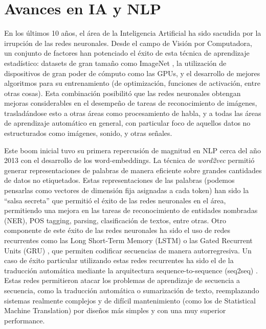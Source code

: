 \section{Avances en IA y NLP}

En los últimos 10 años, el área de la Inteligencia Artificial ha sido sacudida por la irrupción de las redes neuronales. Desde el campo de Visión por Computadora, un conjunto de factores han potenciado el éxito de esta técnica de aprendizaje estadístico: datasets de gran tamaño como ImageNet \cite{imagenet2009deng}, la utilización de dispositivos de gran poder de cómputo como las GPUs, y el desarrollo de mejores algoritmos para su entrenamiento (de optimización, funciones de activación, entre otras cosas). Esta combinación posibilitó que las redes neuronales obtengan mejoras considerables en el desempeño de tareas de reconocimiento de imágenes, trasladándose esto a otras áreas como procesamiento de habla, y a todas las áreas de aprendizaje automático en general, con particular foco de aquellos datos no estructurados como imágenes, sonido, y otras señales.

Este boom inicial tuvo su primera repercusión de magnitud en NLP cerca del año 2013 con el desarrollo de los word-embeddings. La técnica de \emph{word2vec} \cite{mikolov2013distributed} permitió generar representaciones de palabras de manera eficiente sobre grandes cantidades de datos no etiquetados. Estas representaciones de las palabras (podemos pensarlas como vectores de dimensión fija asignadas a cada token) han sido la ``salsa secreta'' que permitió el éxito de las redes neuronales en el área, permitiendo una mejora en las tareas de reconocimiento de entidades nombradas (NER), POS tagging, parsing, clasificación de textos, entre otras. Otro componente de este éxito de las redes neuronales ha sido el uso de redes recurrentes como las Long Short-Term Memory (LSTM) \cite{hochreiter1997long} o las Gated Recurrent Units (GRU) \cite{cho-etal-2014-learning}, que permiten codificar secuencias de manera autorregresiva. Un caso de éxito particular utilizando estas redes recurrentes ha sido el de la traducción automática mediante la arquitectura sequence-to-sequence (seq2seq) \cite{sutskever2014sequence}. Estas redes permitieron atacar los problemas de aprendizaje de secuencia a secuencia, como la traducción automática o sumarización de texto, reemplazando sistemas realmente complejos y de difícil mantenimiento (como los de Statistical Machine Translation) por diseños más simples y con una muy superior performance.

